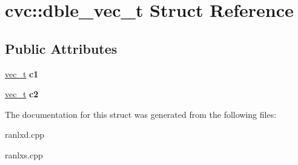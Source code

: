 \hypertarget{structcvc_1_1dble__vec__t}{\section{cvc\-:\-:dble\-\_\-vec\-\_\-t Struct Reference}
\label{structcvc_1_1dble__vec__t}
}
\subsection*{Public Attributes}
\begin{DoxyCompactItemize}
\item 
\hypertarget{structcvc_1_1dble__vec__t_ace24e004afed59dfbae70f37f4209958}{\hyperlink{structcvc_1_1vec__t}{vec\-\_\-t} {\bfseries c1}}\label{structcvc_1_1dble__vec__t_ace24e004afed59dfbae70f37f4209958}

\item 
\hypertarget{structcvc_1_1dble__vec__t_a43673325f12909693dce9e3fb31c8916}{\hyperlink{structcvc_1_1vec__t}{vec\-\_\-t} {\bfseries c2}}\label{structcvc_1_1dble__vec__t_a43673325f12909693dce9e3fb31c8916}

\end{DoxyCompactItemize}


The documentation for this struct was generated from the following files\-:\begin{DoxyCompactItemize}
\item 
ranlxd.\-cpp\item 
ranlxs.\-cpp\end{DoxyCompactItemize}
